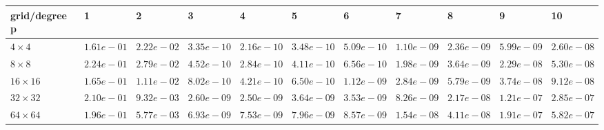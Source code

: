 \begin{tabular}{lllllllllll}
\hline
 grid/degree p   & 1          & 2          & 3          & 4          & 5          & 6          & 7          & 8          & 9          & 10         \\
\hline
 $4 \times 4$    & $1.61e-01$ & $2.22e-02$ & $3.35e-10$ & $2.16e-10$ & $3.48e-10$ & $5.09e-10$ & $1.10e-09$ & $2.36e-09$ & $5.99e-09$ & $2.60e-08$ \\
 $8 \times 8$    & $2.24e-01$ & $2.79e-02$ & $4.52e-10$ & $2.84e-10$ & $4.11e-10$ & $6.56e-10$ & $1.98e-09$ & $3.64e-09$ & $2.29e-08$ & $5.30e-08$ \\
 $16 \times 16$  & $1.65e-01$ & $1.11e-02$ & $8.02e-10$ & $4.21e-10$ & $6.50e-10$ & $1.12e-09$ & $2.84e-09$ & $5.79e-09$ & $3.74e-08$ & $9.12e-08$ \\
 $32 \times 32$  & $2.10e-01$ & $9.32e-03$ & $2.60e-09$ & $2.50e-09$ & $3.64e-09$ & $3.53e-09$ & $8.26e-09$ & $2.17e-08$ & $1.21e-07$ & $2.85e-07$ \\
 $64 \times 64$  & $1.96e-01$ & $5.77e-03$ & $6.93e-09$ & $7.53e-09$ & $7.96e-09$ & $8.57e-09$ & $1.54e-08$ & $4.11e-08$ & $1.91e-07$ & $5.82e-07$ \\
\hline
\end{tabular}